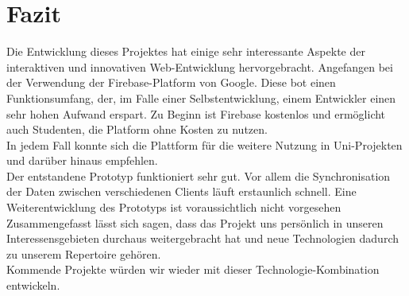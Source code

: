 \chapter{Fazit}
Die Entwicklung dieses Projektes hat einige sehr interessante Aspekte der interaktiven und innovativen Web-Entwicklung hervorgebracht.
Angefangen bei der Verwendung der Firebase-Platform von Google. Diese bot einen Funktionsumfang, der, im Falle einer Selbstentwicklung,
einem Entwickler einen sehr hohen Aufwand erspart. Zu Beginn ist Firebase kostenlos und ermöglicht auch Studenten, die Platform ohne Kosten zu nutzen.\\
In jedem Fall konnte sich die Plattform für die weitere Nutzung in Uni-Projekten und darüber hinaus empfehlen.
\\
Der entstandene Prototyp funktioniert sehr gut. Vor allem die Synchronisation der Daten zwischen verschiedenen Clients läuft erstaunlich schnell.
Eine Weiterentwicklung des Prototyps ist voraussichtlich nicht vorgesehen
\\
Zusammengefasst lässt sich sagen, dass das Projekt uns persönlich in unseren Interessensgebieten durchaus weitergebracht hat und neue Technologien dadurch zu unserem
Repertoire gehören.\\
Kommende Projekte würden wir wieder mit dieser Technologie-Kombination entwickeln.